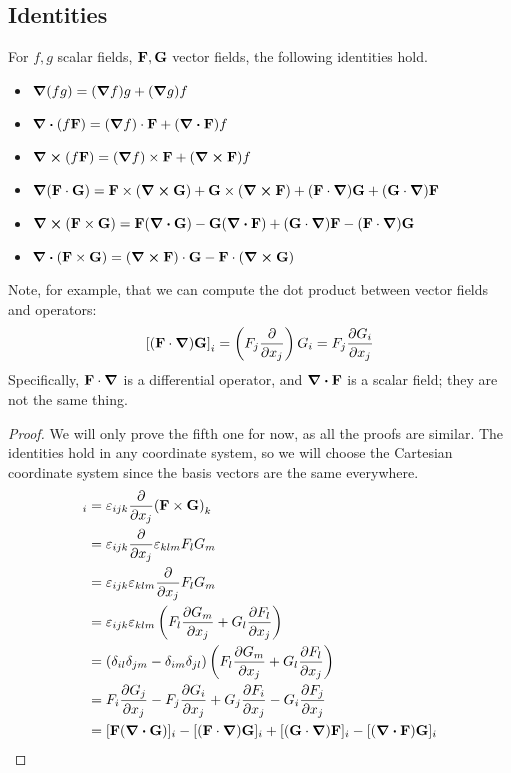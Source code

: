 \subsection{Identities}
\begin{proposition}
	For \(f, g\) scalar fields, \(\vb F, \vb G\) vector fields, the following identities hold.
	\begin{itemize}
		\item \(\grad(fg) = (\grad f)g + (\grad g)f\)
		\item \(\div(f \vb F) = (\grad f)\cdot \vb F + (\div {\vb F})f\)
		\item \(\curl(f \vb F) = (\grad f)\times \vb F + (\curl {\vb F})f\)
		\item \(\grad(\vb F \cdot \vb G) = \vb F \times (\curl{\vb G}) + \vb G \times (\curl{\vb F}) + (\vb F \cdot \grad)\vb G + (\vb G \cdot \grad)\vb F\)
		\item \(\curl(\vb F \times \vb G) = \vb F(\div{\vb G}) - \vb G(\div{\vb F}) + (\vb G \cdot \grad)\vb F - (\vb F \cdot \grad)\vb G\)
		\item \(\div(\vb F \times \vb G) = (\curl{\vb F}) \cdot \vb G - \vb F \cdot (\curl{\vb G})\)
	\end{itemize}
\end{proposition}
Note, for example, that we can compute the dot product between vector fields and operators:
\[
	\left[ (\vb F \cdot \grad) \vb G \right]_i = \left( F_j \pdv{x_j} \right) G_i = F_j \pdv{G_i}{x_j}
\]
Specifically, \(\vb F \cdot \grad\) is a differential operator, and \(\div{\vb F}\) is a scalar field; they are not the same thing.
\begin{proof}
	We will only prove the fifth one for now, as all the proofs are similar.
	The identities hold in any coordinate system, so we will choose the Cartesian coordinate system since the basis vectors are the same everywhere.
	\begin{align*}
		[\curl(\vb F \times \vb G)]_i & = \varepsilon_{ijk} \pdv{x_j} (\vb F \times \vb G)_k                                                            \\
		                              & = \varepsilon_{ijk} \pdv{x_j} \varepsilon_{klm} F_l G_m                                                         \\
		                              & = \varepsilon_{ijk} \varepsilon_{klm} \pdv{x_j} F_l G_m                                                         \\
		                              & = \varepsilon_{ijk} \varepsilon_{klm} \left( F_l \pdv{G_m}{x_j} + G_l \pdv{F_l}{x_j}  \right)                   \\
		                              & = (\delta_{il}\delta_{jm} - \delta_{im}\delta_{jl}) \left( F_l \pdv{G_m}{x_j} + G_l \pdv{F_l}{x_j} \right)      \\
		                              & = F_i \pdv{G_j}{x_j} - F_j \pdv{G_i}{x_j} + G_j \pdv{F_i}{x_j} - G_i \pdv{F_j}{x_j}                             \\
		                              & = [\vb F(\div{\vb G})]_i - [(\vb F \cdot \grad)\vb G]_i + [(\vb G \cdot \grad)\vb F]_i - [(\div{\vb F})\vb G]_i
	\end{align*}
\end{proof}

